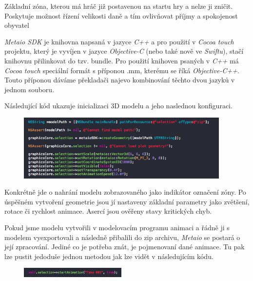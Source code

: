 \documentclass[twoside,12pt]{article}
\begin{document}
Základní zóna, kterou má hráč již postavenou na startu hry a nelze ji zničit. Poskytuje možnost řízení velikosti daně a tím ovlivňovat příjmy a spokojenost obyvatel

\textit{Metaio SDK} je knihovna napsaná v jazyce \textit{C++} a pro použití v \textit{Cocoa touch} projektu, který je vyvíjen v jazyce \textit{Objective-C} (nebo také nově ve \textit{Swiftu}), stačí knihovnu přilinkovat do tzv. bundle. Pro použití knihoven psaných v \textit{C++} má \textit{Cocoa touch} speciální formát s příponou .mm, kterému se říká \textit{Objective-C++}. Touto příponou dáváme překladači najevo kombinování těchto dvou jazyků v jednom souboru. 

Následující kód ukazuje inicializaci 3D modelu a jeho naslednou konfiguraci.

\begin{figure}[H]
\centering
    \includegraphics[width=400px, center]{images/code_model_loading.png}
\captionsetup{justification=centering}
    \label{navigation_bar}
\end{figure}

Konkrétně jde o nahrání modelu zobrazovaného jako indikátor označení zóny. Po úspěšném vytvoření geometrie jsou jí nastaveny základní parametry jako zvětšení, rotace či rychlost animace. Asercí jsou ověřeny stavy kritických chyb. 

Pokud jsme modelu vytvořili v modelovacím programu animaci a řádně ji s modelem vyexportovali a následně přibalili do zip archivu, \textit{Metaio} se postará o její zpracování. Jediné co je potřeba znát, je pojmenovaní dané animace. Tu pak lze pustit jedoduše jednou metodou jak lze vidět v následujícím kódu.

\begin{figure}[H]
\centering
    \includegraphics[width=200px, center]{images/code_animation.png}
\captionsetup{justification=centering}
    \label{navigation_bar}
\end{figure}
\end{document}
